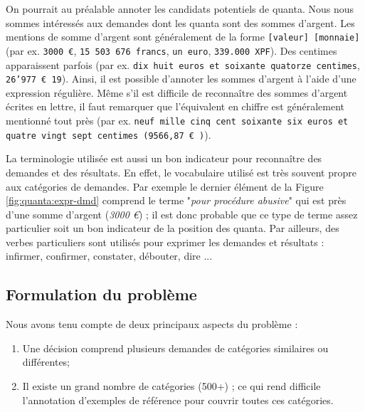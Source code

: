 On pourrait au préalable annoter les candidats potentiels de quanta. Nous nous sommes intéressés aux demandes dont les quanta sont des sommes d'argent. Les mentions de somme d'argent sont généralement de la forme \og \texttt{[valeur] [monnaie]} \fg{} (par ex. \texttt{3000 \euro}, \texttt{15 503 676 francs}, \texttt{un euro}, \texttt{339.000 XPF}). Des centimes apparaissent parfois (par ex. \texttt{dix huit euros et soixante quatorze centimes}, \texttt{26'977 \euro{} 19}). Ainsi, il est possible d'annoter les sommes d'argent à l'aide d'une expression régulière. Même s'il est difficile de reconnaître des sommes d'argent écrites en lettre, il faut remarquer que l'équivalent en chiffre est généralement mentionné tout près (par ex. \texttt{neuf mille cinq cent soixante six euros et quatre vingt sept centimes (9566,87 \euro{} )}). 

La terminologie utilisée est aussi un bon indicateur pour reconnaître des demandes et des résultats. En effet, le vocabulaire utilisé est très souvent propre aux catégories de demandes. Par exemple le dernier élément de la Figure \ref{fig:quanta:expr-dmd} comprend le terme "\textit{pour procédure abusive}" qui est près d'une somme d'argent (\textit{3000 \euro{}}) ; il est donc probable que ce type de terme assez particulier soit un bon indicateur de la position des quanta. Par ailleurs, des verbes particuliers sont utilisés pour exprimer les demandes et résultats : infirmer, confirmer, constater, débouter, dire ... %






\subsection{Formulation du problème}
\label{sec:quanta:formulation}

Nous avons tenu compte de deux principaux aspects du problème :
\begin{enumerate}
	\item Une décision comprend plusieurs demandes de catégories similaires ou différentes;
	\item Il existe un grand nombre de catégories (500+) ; ce qui rend difficile l'annotation d'exemples de référence pour couvrir toutes ces catégories.
\end{enumerate}

